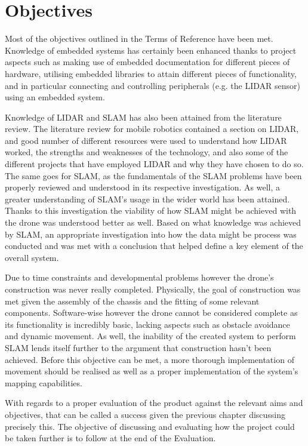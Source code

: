 	
		\section{Objectives}
		Most of the objectives outlined in the Terms of Reference have been met. Knowledge of embedded systems has certainly been enhanced thanks to project aspects such as making use of embedded documentation for different pieces of hardware, utilising embedded libraries to attain different pieces of functionality, and in particular connecting and controlling peripherals (e.g. the LIDAR sensor) using an embedded system. 
		
		Knowledge of LIDAR and SLAM has also been attained from the literature review. The literature review for mobile robotics contained a section on LIDAR, and good number of different resources were used to understand how LIDAR worked, the strengths and weaknesses of the technology, and also some of the different projects that have employed LIDAR and why they have chosen to do so. The same goes for SLAM, as the fundamentals of the SLAM problems have been properly reviewed and understood in its respective investigation. As well, a greater understanding of SLAM's usage in the wider world has been attained. Thanks to this investigation the viability of how SLAM might be achieved with the drone was understood better as well. Based on what knowledge was achieved by SLAM, an appropriate investigation into how the data might be process was conducted and was met with a conclusion that helped define a key element of the overall system.
		
		Due to time constraints and developmental problems however the drone's construction was never really completed. Physically, the goal of construction was met given the assembly of the chassis and the fitting of some relevant components. Software-wise however the drone cannot be considered complete as its functionality is incredibly basic, lacking aspects such as obstacle avoidance and dynamic movement. As well, the inability of the created system to perform SLAM lends itself further to the argument that construction hasn't been achieved. Before this objective can be met, a more thorough implementation of movement should be realised as well as a proper implementation of the system's mapping capabilities. 
		
		With regards to a proper evaluation of the product against the relevant aims and objectives, that can be called a success given the previous chapter discussing precisely this. The objective of discussing and evaluating how the project could be taken further is to follow at the end of the Evaluation.
		
